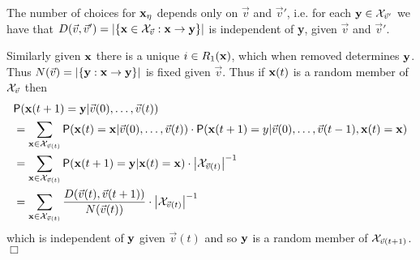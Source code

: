 \documentclass[11pt]{article}
\newenvironment{proof}{{\bf Proof:}}{\hfill\mbox{$\Box$}}
\def\bx{{\bf x}}
\def\by{{\bf y}}
\def\br{{\bf r}}
\def\bs{{\bf s}}
\def\bt{{\bf t}}
\def\bx{{\bf x}}
\newcommand{\set}[1]{\left\{#1\right\}}
\def\cX{{\cal X}}
\def\Pr{{\sf P}}
\newcommand{\ignore}[1]{}
\def\vv{\vec{v}}
\newcommand{\beq}[1]{\begin{equation}\label{#1}}
\newcommand{\eeq}{\end{equation}}
\begin{document}
\begin{proof}
\ignore{
Next let $c$
be the number of distinct neighbours of $\eta$ in \bx. We will use the notation
$|z|=z_1+\cdots+z_k$ for a vector $z=(z_1,\ldots,z_k)$. 
The number of choices for \bx\
is then 
\beq{indy}
\sum_{\substack{0\leq c\leq d-a-b\\0\leq b_1\leq b}}\ 
\sum_{\substack{\br\in [d]^{b_1},\bs\in [d]^{b_2},\bt\in [d]^c\\|r|+|s|=d-a-c}}(n-t)
\binom{m-v'-v_1'}{a}\binom{v_1'}{b}\binom{v'}{d-a-b}(v')^{d-a-b}\binom{d}{c}\binom{d-c}{r_1,\ldots,s_b}.
\eeq 
(i) $n-t$ choices for $\xi\notin L_\by$, (ii) $\binom{m-v'-v_1'}{a}$ choices for 
the set of vertices of degree one in \bx\ that become of degree zero in \by, (iii) $\binom{v_1'}{b}$ choices for 
the set of vertices of degree at least two in $\bx$ 
that become of degree one in $\by$, (iv) $\binom{v'}{d-a-b}$ choices for the set of vertices of degree at least two in \bx\
that are incident with $\xi$ and have degree at least two in \by, (v) $d!$ ways of filling in $\bx_\xi$. 
}
The number of choices for $\bx_\eta$ depends only on $\vv$ and $\vv'$,
i.e. for each $\by\in \cX_{\vv'}$ we have that 
$D(\vv,\vv') = \left|\set{\bx \in \cX_{\vv} : \bx \to \by }\right|$ 
is independent of \by, given $\vv$ and
$\vv'$. 

Similarly given $\bx$ there is a unique $i\in R_1(\bx)$, which when removed determines
$\by$. Thus $N(\vv) = \left|\set{\by : \bx \to \by }\right|$ is fixed given $\vv$.  Thus if $\bx(t)$ is a random member of $\cX_{\vv}$ then 
\begin{align*}
&\Pr(\bx(t+1) = \by | \vv(0),\ldots,\vv(t))\\ 
&= \sum_{\bx \in \cX_{\vv(t)}}\Pr(\bx(t) = \bx | \vv(0),\ldots,\vv(t))\cdot \Pr(\bx(t+1) = y | \vv(0),\ldots,\vv(t-1),\bx(t)=\bx)\\
&= \sum_{\bx\in\cX_{\vv(t)}} \Pr(\bx(t+1)=\by | \bx(t)=\bx) \cdot \left|\cX_{\vv(t)}\right|^{-1}\\
&= \sum_{\bx\in\cX_{\vv(t)}} \frac{D(\vv(t),\vv(t+1))}{N(\vv(t))} \cdot \left|\cX_{\vv(t)}\right|^{-1}
\end{align*}
which is independent of $\by$ given $\vv(t)$ and so $\by$ is a random member of $\cX_{\vv(t+1)}$.
\end{proof}
\end{document}
